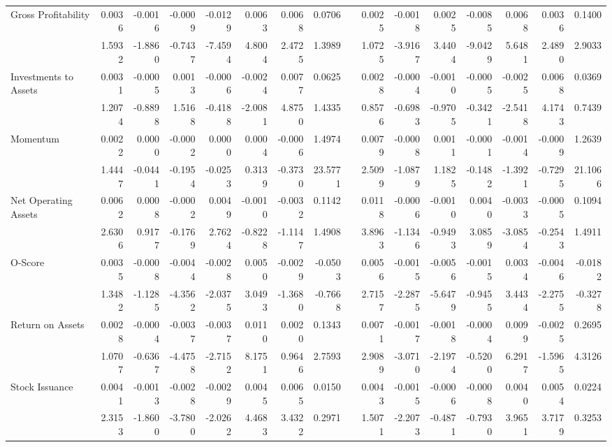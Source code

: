 \begin{sidewaystable}[htbp]
{\begin{tabular}{lrrrrrrrrrrrrrrr}
Gross Profitability & 0.0036 & -0.0016 & -0.0009 & -0.0129 & 0.0063 & 0.0068 & 0.0706 &       & 0.0025 & -0.0018 & 0.0025 & -0.0085 & 0.0068 & 0.0036 & 0.1400 \\
& 1.5932 & -1.8860 & -0.7437 & -7.4594 & 4.8004 & 2.4725 & 1.3989 &       & 1.0725 & -3.9167 & 3.4404 & -9.0429 & 5.6481 & 2.4890 & 2.9033 \\
Investments to Assets & 0.0031 & -0.0005 & 0.0013 & -0.0006 & -0.0024 & 0.0077 & 0.0625 &       & 0.0028 & -0.0004 & -0.0010 & -0.0005 & -0.0025 & 0.0068 & 0.0369 \\
& 1.2074 & -0.8898 & 1.5168 & -0.4188 & -2.0081 & 4.8750 & 1.4335 &       & 0.8576 & -0.6983 & -0.9705 & -0.3421 & -2.5418 & 4.1743 & 0.7439 \\
Momentum & 0.0022 & 0.0000 & -0.0002 & 0.0000 & 0.0004 & -0.0006 & 1.4974 &       & 0.0079 & -0.0008 & 0.0011 & -0.0001 & -0.0014 & -0.0009 & 1.2639 \\
& 1.4447 & -0.0441 & -0.1954 & -0.0253 & 0.3139 & -0.3730 & 23.5771 &       & 2.5099 & -1.0879 & 1.1825 & -0.1482 & -1.3921 & -0.7295 & 21.1066 \\
Net Operating Assets & 0.0062 & 0.0008 & -0.0002 & 0.0049 & -0.0010 & -0.0032 & 0.1142 &       & 0.0118 & -0.0006 & -0.0010 & 0.0040 & -0.0033 & -0.0005 & 0.1094 \\
& 2.6306 & 0.9177 & -0.1769 & 2.7624 & -0.8228 & -1.1147 & 1.4908 &       & 3.8963 & -1.1346 & -0.9493 & 3.0859 & -3.0854 & -0.2543 & 1.4911 \\
O-Score & 0.0035 & -0.0008 & -0.0044 & -0.0028 & 0.0050 & -0.0029 & -0.0503 &       & 0.0056 & -0.0015 & -0.0056 & -0.0015 & 0.0034 & -0.0046 & -0.0182 \\
& 1.3482 & -1.1285 & -4.3562 & -2.0375 & 3.0493 & -1.3680 & -0.7668 &       & 2.7157 & -2.2875 & -5.6479 & -0.9455 & 3.4434 & -2.2755 & -0.3278 \\
Return on Assets & 0.0028 & -0.0004 & -0.0037 & -0.0037 & 0.0110 & 0.0020 & 0.1343 &       & 0.0071 & -0.0017 & -0.0018 & -0.0004 & 0.0099 & -0.0025 & 0.2695 \\
& 1.0707 & -0.6367 & -4.4758 & -2.7152 & 8.1751 & 0.9646 & 2.7593 &       & 2.9089 & -3.0710 & -2.1974 & -0.5200 & 6.2917 & -1.5965 & 4.3126 \\
Stock Issuance & 0.0041 & -0.0013 & -0.0028 & -0.0029 & 0.0045 & 0.0065 & 0.0150 &       & 0.0043 & -0.0015 & -0.0006 & -0.0008 & 0.0040 & 0.0054 & 0.0224 \\
& 2.3153 & -1.8600 & -3.7800 & -2.0262 & 4.4683 & 3.4322 & 0.2971 &       & 1.5071 & -2.2073 & -0.4871 & -0.7930 & 3.9651 & 3.7179 & 0.3253 \\
\bottomrule
\end{tabular}%
}
\label{tab:liq-ff6}%
\end{sidewaystable}%


